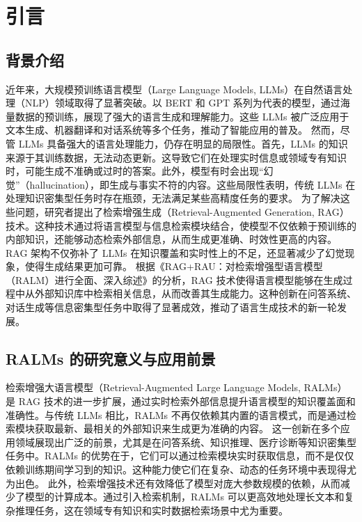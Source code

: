 \chapter{引\hspace{6pt}言}

\section{背景介绍}
近年来，大规模预训练语言模型（Large Language Models, LLMs）在自然语言处理（NLP）领域取得了显著突破\cite{vaswani2023attentionneed}。以 BERT 和 GPT 系列为代表的模型，通过海量数据的预训练，展现了强大的语言生成和理解能力。这些 LLMs 被广泛应用于文本生成、机器翻译和对话系统等多个任务，推动了智能应用的普及\cite{devlin2019bertpretrainingdeepbidirectional}\cite{brown2020languagemodelsfewshotlearners}。
然而，尽管 LLMs 具备强大的语言处理能力，仍存在明显的局限性。首先，LLMs 的知识来源于其训练数据，无法动态更新。这导致它们在处理实时信息或领域专有知识时，可能生成不准确或过时的答案。此外，模型有时会出现“幻觉”（hallucination），即生成与事实不符的内容。这些局限性表明，传统 LLMs 在处理知识密集型任务时存在瓶颈，无法满足某些高精度任务的要求\cite{Ji_2023}。
为了解决这些问题，研究者提出了检索增强生成（Retrieval-Augmented Generation, RAG）技术。这种技术通过将语言模型与信息检索模块结合，使模型不仅依赖于预训练的内部知识，还能够动态检索外部信息，从而生成更准确、时效性更高的内容。RAG 架构不仅弥补了 LLMs 在知识覆盖和实时性上的不足，还显著减少了幻觉现象，使得生成结果更加可靠\cite{lewis2021retrievalaugmentedgenerationknowledgeintensivenlp}\cite{chan2024rqraglearningrefinequeries}。
根据《RAG+RAU：对检索增强型语言模型（RALM）进行全面、深入综述》的分析，RAG 技术使得语言模型能够在生成过程中从外部知识库中检索相关信息，从而改善其生成能力\cite{hu2024ragrausurveyretrievalaugmented}。这种创新在问答系统、对话生成等信息密集型任务中取得了显著成效，推动了语言生成技术的新一轮发展。
\section{RALMs 的研究意义与应用前景}
检索增强大语言模型（Retrieval-Augmented Large Language Models, RALMs）是 RAG 技术的进一步扩展，通过实时检索外部信息提升语言模型的知识覆盖面和准确性。与传统 LLMs 相比，RALMs 不再仅依赖其内置的语言模式，而是通过检索模块获取最新、最相关的外部知识来生成更为准确的内容。
这一创新在多个应用领域展现出广泛的前景，尤其是在问答系统、知识推理、医疗诊断等知识密集型任务中。RALMs 的优势在于，它们可以通过检索模块实时获取信息，而不是仅仅依赖训练期间学习到的知识。这种能力使它们在复杂、动态的任务环境中表现得尤为出色。
此外，检索增强技术还有效降低了模型对庞大参数规模的依赖，从而减少了模型的计算成本。通过引入检索机制，RALMs 可以更高效地处理长文本和复杂推理任务，这在领域专有知识和实时数据检索场景中尤为重要。